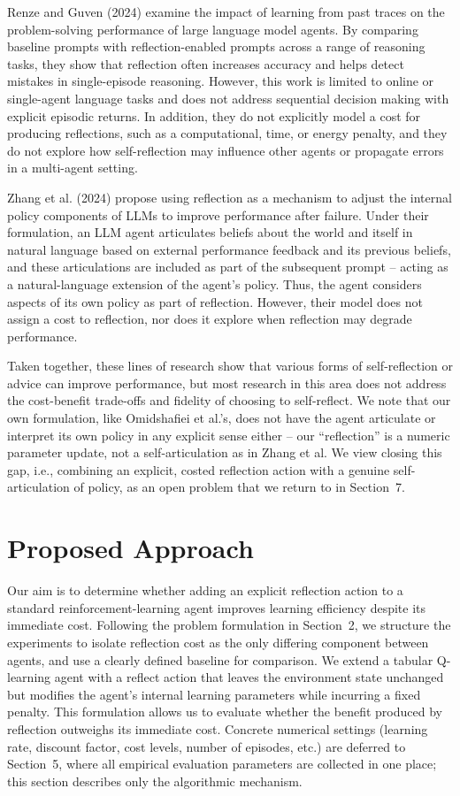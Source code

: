 \documentclass[11pt]{article}
\begin{document}
Renze and Guven (2024) examine the impact of learning from past traces on the problem-solving performance of large language model agents. By comparing baseline prompts with reflection-enabled prompts across a range of reasoning tasks, they show that reflection often increases accuracy and helps detect mistakes in single-episode reasoning. However, this work is limited to online or single-agent language tasks and does not address sequential decision making with explicit episodic returns. In addition, they do not explicitly model a cost for producing reflections, such as a computational, time, or energy penalty, and they do not explore how self-reflection may influence other agents or propagate errors in a multi-agent setting.

Zhang et al. (2024) propose using reflection as a mechanism to adjust the internal policy components of LLMs to improve performance after failure. Under their formulation, an LLM agent articulates beliefs about the world and itself in natural language based on external performance feedback and its previous beliefs, and these articulations are included as part of the subsequent prompt -- acting as a natural-language extension of the agent's policy. Thus, the agent considers aspects of its own policy as part of reflection. However, their model does not assign a cost to reflection, nor does it explore when reflection may degrade performance.

Taken together, these lines of research show that various forms of self-reflection or advice can improve performance, but most research in this area does not address the cost-benefit trade-offs and fidelity of choosing to self-reflect. We note that our own formulation, like Omidshafiei et al.'s, does not have the agent articulate or interpret its own policy in any explicit sense either -- our ``reflection'' is a numeric parameter update, not a self-articulation as in Zhang et al. We view closing this gap, i.e., combining an explicit, costed reflection action with a genuine self-articulation of policy, as an open problem that we return to in Section~7.

\section{Proposed Approach}

Our aim is to determine whether adding an explicit reflection action to a standard reinforcement-learning agent improves learning efficiency despite its immediate cost. Following the problem formulation in Section~2, we structure the experiments to isolate reflection cost as the only differing component between agents, and use a clearly defined baseline for comparison. We extend a tabular Q-learning agent with a reflect action that leaves the environment state unchanged but modifies the agent's internal learning parameters while incurring a fixed penalty. This formulation allows us to evaluate whether the benefit produced by reflection outweighs its immediate cost. Concrete numerical settings (learning rate, discount factor, cost levels, number of episodes, etc.) are deferred to Section~5, where all empirical evaluation parameters are collected in one place; this section describes only the algorithmic mechanism.
\end{document}

